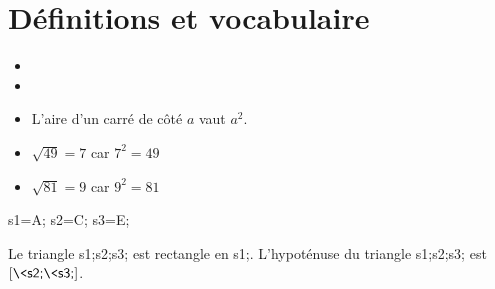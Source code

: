 \documentclass[../main.tex]{subfiles}
\begin{document}
    \part{Définitions et vocabulaire}

    \begin{exemple}
        \begin{itemize}
            \item{}
            \item{}
            \item L'aire d'un carré de côté $a$ vaut $a^2$.
        \end{itemize}
    \end{exemple}

    \begin{exemple}
        \begin{itemize}
            \item$\sqrt{49}=7$ car $7^2=49$
        \item$\sqrt{81}=9$ car $9^2=81$
        \end{itemize}
    \end{exemple}

    \begin{exemple}\par\noindent
        \>s1=A;%
        \>s2=C;%
        \>s3=E;%
        \begin{minipage}{.35\linewidth}
        \end{minipage}\hspace{.05\linewidth}
        \begin{minipage}{.55\linewidth}
            Le triangle \textsf{\<s1;\<s2;\<s3;} est rectangle en
            \textsf{\<s1;}. L'hypoténuse du triangle \textsf{\<s1;\<s2;\<s3;}
            est $[\textsf{\<s2;\<s3;}]$.                
        \end{minipage}
    \end{exemple}
\end{document}
